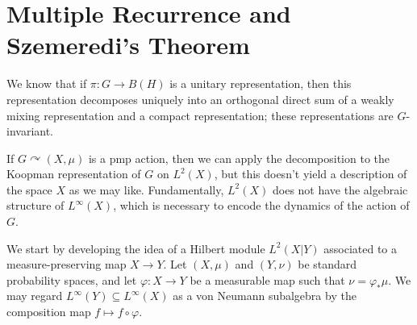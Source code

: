 \documentclass[10pt]{mypackage}
\begin{document}
\section{Multiple Recurrence and Szemeredi's Theorem}%
We know that if $\pi\colon G\rightarrow B\left( H \right)$ is a unitary representation, then this representation decomposes uniquely into an orthogonal direct sum of a weakly mixing representation and a compact representation; these representations are $G$-invariant.

If $G\curvearrowright \left( X,\mu \right)$ is a pmp action, then we can apply the decomposition to the Koopman representation of $G$ on $L^2\left( X \right)$, but this doesn't yield a description of the space $X$ as we may like. Fundamentally, $L^2\left( X \right)$ does not have the algebraic structure of $L^{\infty}\left( X \right)$, which is necessary to encode the dynamics of the action of $G$.

We start by developing the idea of a Hilbert module $L^2\left( X|Y \right)$ associated to a measure-preserving map $X\rightarrow Y$. Let $\left( X,\mu \right)$ and $\left( Y,\nu \right)$ be standard probability spaces, and let $\varphi\colon X\rightarrow Y$ be a measurable map such that $\nu = \varphi_{\ast}\mu$. We may regard $L^{\infty}\left( Y \right)\subseteq L^{\infty}\left( X \right)$ as a von Neumann subalgebra by the composition map $f\mapsto f\circ\varphi$.
\end{document}

